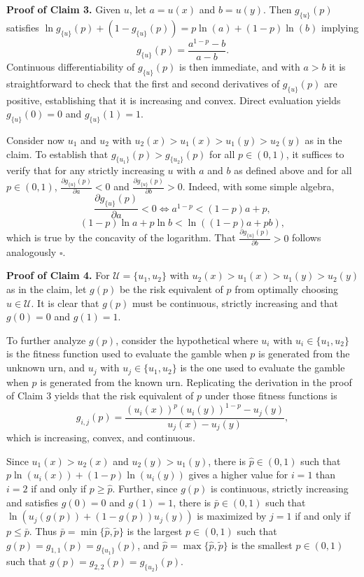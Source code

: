 \documentclass[12pt,a4paper]{article}
\newenvironment{original}
  {\par\noindent\color{black}\smallskip}
  {\par\smallskip}
\begin{document}
\begin{original}
\textbf{Proof of Claim 3.} Given $u$, let $a = u(x)$ and $b = u(y)$. Then $g_{\{u\}}(p)$ satisfies $\ln g_{\{u\}}(p) + (1 - g_{\{u\}}(p)) = p\ln(a) + (1-p)\ln(b)$ implying
\[
g_{\{u\}}(p) = \frac{a^{1-p} - b}{a - b}.
\]
Continuous differentiability of $g_{\{u\}}(p)$ is then immediate, and with $a > b$ it is straightforward to check that the first and second derivatives of $g_{\{u\}}(p)$ are positive, establishing that it is increasing and convex. Direct evaluation yields $g_{\{u\}}(0) = 0$ and $g_{\{u\}}(1) = 1$.

Consider now $u_1$ and $u_2$ with $u_2(x) > u_1(x) > u_1(y) > u_2(y)$ as in the claim. To establish that $g_{\{u_1\}}(p) > g_{\{u_2\}}(p)$ for all $p \in (0, 1)$, it suffices to verify that for any strictly increasing $u$ with $a$ and $b$ as defined above and for all $p \in (0, 1)$, $\frac{\partial g_{\{u\}}(p)}{\partial a} < 0$ and $\frac{\partial g_{\{u\}}(p)}{\partial b} > 0$. Indeed, with some simple algebra,
\[
\frac{\partial g_{\{u\}}(p)}{\partial a} < 0 \iff a^{1-p} < (1-p)a + p,
\]
\[
(1-p)\ln a + p\ln b < \ln((1-p)a + pb),
\]
which is true by the concavity of the logarithm. That $\frac{\partial g_{\{u\}}(p)}{\partial b} > 0$ follows analogously $\square$.

\textbf{Proof of Claim 4.} For $\mathcal{U} = \{u_1, u_2\}$ with $u_2(x) > u_1(x) > u_1(y) > u_2(y)$ as in the claim, let $g(p)$ be the risk equivalent of $p$ from optimally choosing $u \in \mathcal{U}$. It is clear that $g(p)$ must be continuous, strictly increasing and that $g(0) = 0$ and $g(1) = 1$.

To further analyze $g(p)$, consider the hypothetical where $u_i$ with $u_i \in \{u_1, u_2\}$ is the fitness function used to evaluate the gamble when $p$ is generated from the unknown urn, and $u_j$ with $u_j \in \{u_1, u_2\}$ is the one used to evaluate the gamble when $p$ is generated from the known urn. Replicating the derivation in the proof of Claim 3 yields that the risk equivalent of $p$ under those fitness functions is
\[
g_{i,j}(p) = \frac{(u_i(x))^p (u_i(y))^{1-p} - u_j(y)}{u_j(x) - u_j(y)},
\]
which is increasing, convex, and continuous.

Since $u_1(x) > u_2(x)$ and $u_2(y) > u_1(y)$, there is $\hat{p} \in (0, 1)$ such that $p\ln(u_i(x)) + (1-p)\ln(u_i(y))$ gives a higher value for $i = 1$ than $i = 2$ if and only if $p \geq \hat{p}$. Further, since $g(p)$ is continuous, strictly increasing and satisfies $g(0) = 0$ and $g(1) = 1$, there is $\bar{p} \in (0, 1)$ such that $\ln(u_j(g(p)) + (1-g(p))u_j(y))$ is maximized by $j = 1$ if and only if $p \leq \bar{p}$. Thus $\bar{p} = \min\{\hat{p}, \tilde{p}\}$ is the largest $p \in (0, 1)$ such that $g(p) = g_{1,1}(p) = g_{\{u_1\}}(p)$, and $\hat{p} = \max\{\hat{p}, \tilde{p}\}$ is the smallest $p \in (0, 1)$ such that $g(p) = g_{2,2}(p) = g_{\{u_2\}}(p)$.


\end{original}
\end{document}
